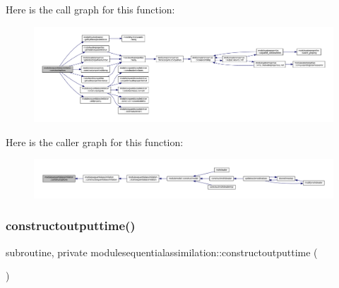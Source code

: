 Here is the call graph for this function\+:\nopagebreak
\begin{figure}[H]
\begin{center}
\leavevmode
\includegraphics[width=350pt]{namespacemodulesequentialassimilation_aab4ab0277115cb693a57157090d95c51_cgraph}
\end{center}
\end{figure}
Here is the caller graph for this function\+:\nopagebreak
\begin{figure}[H]
\begin{center}
\leavevmode
\includegraphics[width=350pt]{namespacemodulesequentialassimilation_aab4ab0277115cb693a57157090d95c51_icgraph}
\end{center}
\end{figure}
\mbox{\label{namespacemodulesequentialassimilation_a4636d1cd0c10613f19a1ca651b6b482f}} 
\subsubsection{\texorpdfstring{constructoutputtime()}{constructoutputtime()}}
{\footnotesize\ttfamily subroutine, private modulesequentialassimilation\+::constructoutputtime (\begin{DoxyParamCaption}{ }\end{DoxyParamCaption})\hspace{0.3cm}{\ttfamily [private]}}

